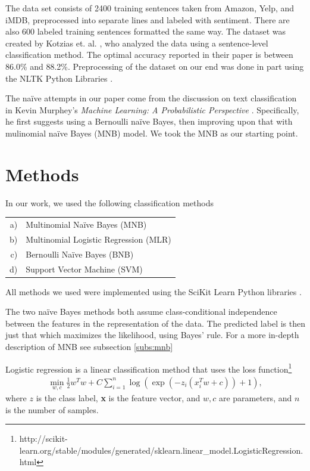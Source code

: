 \documentclass{article} %
\begin{document}
	The data set consists of 2400 training sentences taken from Amazon, Yelp, and iMDB, preprocessed into separate lines and labeled with sentiment. There are also 600 labeled training sentences formatted the same way. The dataset was created by Kotzias et. al. \cite{Kotzias2015}, who analyzed the data using a sentence-level classification method. The optimal accuracy reported in their paper is between 86.0\% and 88.2\%. Preprocessing of the dataset on our end was done in part using the NLTK Python Libraries \cite{nltk}.
	
	The na\"ive attempts in our paper come from the discussion on text classification in Kevin Murphey's \emph{Machine Learning: A Probabilistic Perspective} \cite{Murphy2012}. Specifically, he first suggests using a Bernoulli na\"ive Bayes, then improving upon that with mulinomial na\"ive Bayes (MNB) model. We took the MNB as our starting point. 
	
	
	\section{Methods}
	
	In our work, we used the following classification methods
	
	\begin{tabular}{rl}
		a) & Multinomial Na\"ive Bayes (MNB)\\
		b) & Multinomial Logistic Regression (MLR)\\
		c) & Bernoulli Na\"ive Bayes (BNB) \\
		d) & Support Vector Machine (SVM)
	\end{tabular}

	All methods we used were implemented using the SciKit Learn Python libraries \cite{scikit-learn}. 
	
	The two na\"ive Bayes methods both assume class-conditional independence between the features in the representation of the data. The predicted label is then just that which maximizes the likelihood, using Bayes' rule. For a more in-depth description of MNB see subsection \ref{subs:mnb}
	
	Logistic regression is a linear classification method that uses the loss function\footnote{http://scikit-learn.org/stable/modules/generated/sklearn.linear\_model.LogisticRegression.html}
	\begin{align}
	\min_{w,c}\frac{1}{2}w^Tw + C\sum_{i = 1}^{n}\log\left(\exp\left(-z_i\left(x_i^Tw+c\right)\right)+1\right),
	\end{align}
	where $z$ is the class label, {\bf x} is the feature vector, and $w,c$ are parameters, and $n$ is the number of samples.
	
\end{document}
